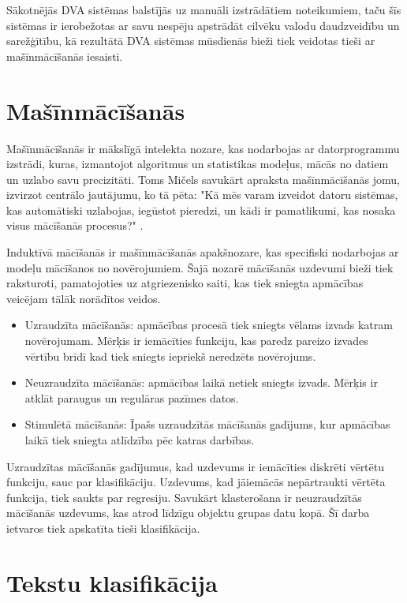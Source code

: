 Sākotnējās DVA sistēmas balstījās uz manuāli izstrādātiem noteikumiem, taču šīs sistēmas ir ierobežotas ar savu nespēju apstrādāt cilvēku valodu daudzveidību un sarežģītību, kā rezultātā DVA sistēmas mūsdienās bieži tiek veidotas tieši ar mašīnmācīšanās iesaisti.

\section{Mašīnmācīšanās}
Mašīnmācīšanās ir mākslīgā intelekta nozare, kas nodarbojas ar datorprogrammu izstrādi, kuras, izmantojot algoritmus un statistikas modeļus, mācās no datiem un uzlabo savu precizitāti. Toms Mičels savukārt apraksta mašīnmācīšanās jomu, izvirzot centrālo jautājumu, ko tā pēta: "Kā mēs varam izveidot datoru sistēmas, kas automātiski uzlabojas, iegūstot pieredzi, un kādi ir pamatlikumi, kas nosaka visus mācīšanās procesus?" \cite{definitionML}.

Induktīvā mācīšanās ir mašīnmācīšanās apakšnozare, kas specifiski nodarbojas ar modeļu mācīšanos no novērojumiem. Šajā nozarē mācīšanās uzdevumi bieži tiek raksturoti, pamatojoties uz atgriezenisko saiti, kas tiek sniegta apmācības veicējam \cite{russel2010} tālāk norādītos veidos.

\begin{itemize}
\item Uzraudzīta mācīšanās: apmācības procesā tiek sniegts vēlams izvads katram novērojumam. Mērķis ir iemācīties funkciju, kas paredz pareizo izvades vērtību brīdī kad tiek sniegts iepriekš neredzēts novērojums.
\item Neuzraudzīta mācīšanās: apmācības laikā netiek sniegts izvads. Mērķis ir atklāt paraugus un regulāras pazīmes datos.
\item Stimulētā mācīšanās: Īpašs uzraudzītās mācīšanās gadījums, kur apmācības laikā tiek sniegta atlīdzība pēc katras darbības.
\end{itemize}

Uzraudzītas mācīšanās gadījumus, kad uzdevums ir iemācīties diskrēti vērtētu funkciju, sauc par klasifikāciju. Uzdevums, kad jāiemācās nepārtraukti vērtēta funkcija, tiek saukts par regresiju. Savukārt klasterošana ir neuzraudzītās mācīšanās uzdevums, kas atrod līdzīgu objektu grupas datu kopā. Šī darba ietvaros tiek apskatīta tieši klasifikācija.

\pagebreak
\section{Tekstu klasifikācija}

